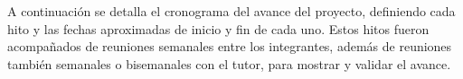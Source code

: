
\noindent A continuación se detalla el cronograma del avance del proyecto,
definiendo cada hito y las fechas aproximadas de inicio y fin de cada uno.
Estos hitos fueron acompañados de reuniones semanales entre los integrantes,
además de reuniones también semanales o bisemanales con el tutor, para mostrar y
validar el avance.

